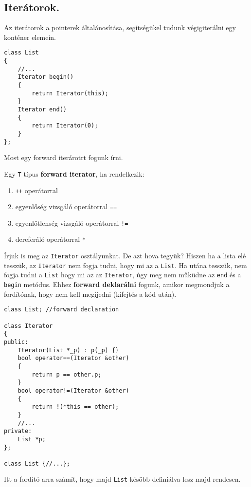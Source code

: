 \documentclass[a4paper,11.5pt]{article}
\begin{document}
	\subsection{Iterátorok.}
	Az iterátorok a pointerek általánosítása, segítségükel tudunk végigiterálni egy konténer elemein.
\begin{lstlisting}
class List
{
	//...
	Iterator begin()
	{
		return Iterator(this);
	}
	Iterator end()
	{
		return Iterator(0);
	}
};
\end{lstlisting}
	Most egy forward iterárotrt fogunk írni.
	\begin{definition}
		Egy \texttt{T} típus \textbf{forward iterator}, ha rendelkezik:
		\begin{enumerate}
			\item \texttt{++} operátorral
			\item egyenlőség vizsgáló operátorral \texttt{==}
			\item egyenlőtlenség vizsgáló operátorral \texttt{!=}
			\item dereferáló operátorral \texttt{*}
		\end{enumerate}
	\end{definition}
	Írjuk is meg az \texttt{Iterator} osztályunkat. De azt hova tegyük? Hiszen ha a lista elé tesszük, az \texttt{Iterator} nem fogja tudni, hogy mi az a \texttt{List}. Ha utána tesszük, nem fogja tudni a \texttt{List} hogy mi az az \texttt{Iterator}, úgy meg nem műküdne az \texttt{end} és a \texttt{begin} metódus. Ehhez \textbf{forward deklarálni} fogunk, amikor megmondjuk a fordítónak, hogy nem kell megijedni (kifejtés a kód után).
	\begin{lstlisting}
class List; //forward declaration

class Iterator
{
public:
	Iterator(List *_p) : p(_p) {}
	bool operator==(Iterator &other)
	{
		return p == other.p;
	}
	bool operator!=(Iterator &other)
	{
		return !(*this == other);
	}
	//...
private:
	List *p;
};

class List {//...};
	\end{lstlisting}
	Itt a fordító arra számít, hogy majd \texttt{List} később definiálva lesz majd rendesen.
	
\end{document}
